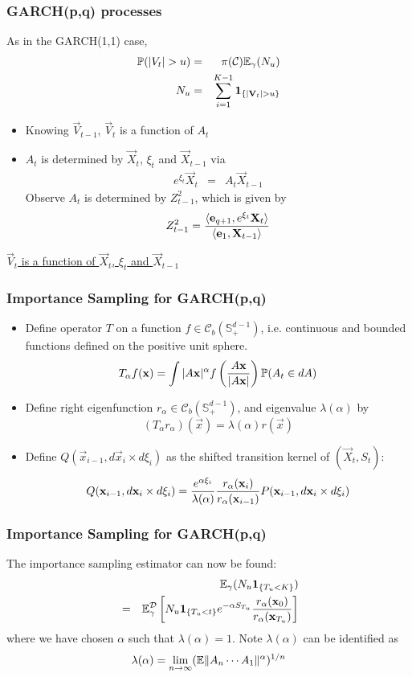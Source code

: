 \documentclass{beamer}
\begin{document}
\begin{frame}
  \frametitle{GARCH(p,q) processes}
  As in the GARCH(1,1) case,
  \begin{eqnarray*}
    \P(|V_t| > u) &=& \pi(\mathcal C) \E_\gamma(N_u) \\
    N_u &=& \sum_{i=1}^{K-1} \1{|\vec V_t| > u}
  \end{eqnarray*}
  \begin{itemize}
  \item Knowing $\vec V_{t-1}$, $\vec V_t$ is a function of $A_t$
  \item $A_t$ is determined by $\vec X_t$, $\xi_t$ and $\vec X_{t-1}$ via
    \begin{eqnarray*}
      e^{\xi_t} \vec X_t &=& A_t \vec X_{t-1}
    \end{eqnarray*}
    Observe $A_t$ is determined by $Z_{t-1}^2$, which is given by
    \[
    Z_{t-1}^2 = {
      \inn{\vec e_{q+1}, e^{\xi_t} \vec X_{t}}
      \over
      \inn{\vec e_{1}, \vec X_{t-1}}
    }
    \]
  \end{itemize}
  \underline{$\vec V_t$ is a function of $\vec X_t$, $\xi_t$ and $\vec X_{t-1}$}
\end{frame}

\begin{frame}
  \frametitle{Importance Sampling for GARCH(p,q)}
  \begin{itemize}
  \item Define operator $T$ on a function $f \in \mathscr C_b(\mathbb
    S^{d-1}_+)$, i.e. continuous and bounded functions defined on the
    positive unit sphere.
    \[
    T_\alpha f(\vec x) = \int |A \vec x|^\alpha
    f\left({A \vec x \over |A \vec x|}\right) \P(A_t \in dA)
    \]
  \item Define right eigenfunction $r_\alpha \in \mathscr C_b(\mathbb
    S^{d-1}_+)$, and eigenvalue $\lambda(\alpha)$ by
    \[
    (T_\alpha r_\alpha)(\vec x) = \lambda(\alpha) r(\vec x)
    \]
  \item Define $Q(\vec x_{i-1}, d\vec x_{i} \times d\xi_{i})$ as the
    shifted transition kernel of $(\vec X_t, S_t)$:
    \[
    Q(\vec x_{i-1}, d\vec x_{i} \times d\xi_{i})
    =
    {e^{\alpha \xi_i} \over \lambda(\alpha) }
    {r_\alpha(\vec x_i) \over r_\alpha(\vec x_{i-1})}
    P(\vec x_{i-1}, d\vec x_{i} \times d\xi_{i})
    \]
  \end{itemize}
\end{frame}

\begin{frame}
  \frametitle{Importance Sampling for GARCH(p,q)}
  The importance sampling estimator can now be found:
    \begin{eqnarray*}
      && \E_\gamma (N_u \1{T_u < K}) \\
      &=& \E_\gamma^{\mathcal D} \left[
      N_u \1{T_u < t} e^{-\alpha S_{T_u}}
      {r_\alpha(\vec x_{0}) \over r_\alpha(\vec x_{T_u})}
    \right]
    \end{eqnarray*}
    where we have chosen $\alpha$ such that $\lambda(\alpha) = 1$.
    Note $\lambda(\alpha)$ can be identified as
    \[
    \lambda(\alpha) = \lim_{n \to \infty} (\E \|A_n \cdots A_1\|^\alpha)^{1/n}
    \]
\end{frame}
\end{document}
